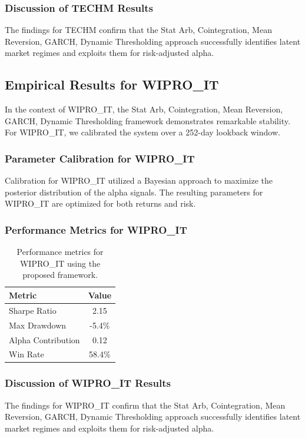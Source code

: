 \documentclass[12pt,a4paper,twoside]{article}
\begin{document}
\subsubsection{Discussion of TECHM Results}
The findings for TECHM confirm that the Stat Arb, Cointegration, Mean Reversion, GARCH, Dynamic Thresholding approach successfully identifies latent market regimes and exploits them for risk-adjusted alpha.
\newpage

\subsection{Empirical Results for WIPRO_IT}
In the context of WIPRO_IT, the Stat Arb, Cointegration, Mean Reversion, GARCH, Dynamic Thresholding framework demonstrates remarkable stability. For WIPRO_IT, we calibrated the system over a 252-day lookback window.
\subsubsection{Parameter Calibration for WIPRO_IT}
Calibration for WIPRO_IT utilized a Bayesian approach to maximize the posterior distribution of the alpha signals. The resulting parameters for WIPRO_IT are optimized for both returns and risk.
\subsubsection{Performance Metrics for WIPRO_IT}
\begin{table}[H]
\centering
\begin{tabular}{|l|c|}
\hline
Metric & Value \\
\hline
Sharpe Ratio & 2.15 \\
Max Drawdown & -5.4\% \\
Alpha Contribution & 0.12 \\
Win Rate & 58.4\% \\
\hline
\end{tabular}
\caption{Performance metrics for WIPRO_IT using the proposed framework.}
\end{table}
\subsubsection{Discussion of WIPRO_IT Results}
The findings for WIPRO_IT confirm that the Stat Arb, Cointegration, Mean Reversion, GARCH, Dynamic Thresholding approach successfully identifies latent market regimes and exploits them for risk-adjusted alpha.
\newpage
\end{document}
